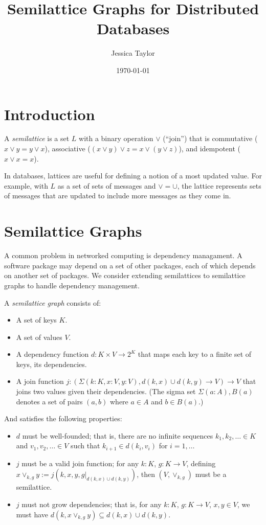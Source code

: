 \documentclass{article}
\title{Semilattice Graphs for Distributed Databases}
\author{Jessica Taylor}
\date{\today}
\begin{document}
    \maketitle
    
    \section{Introduction}
        A \emph{semilattice} is a set $L$ with a binary operation $\vee$ (``join'') that is commutative ($x \vee y = y \vee x$), associative ($(x \vee y) \vee z = x \vee (y \vee z)$), and idempotent ($x \vee x = x$).

        In databases, lattices are useful for defining a notion of a most updated value. For example, with $L$ as a set of sets of messages and $\vee = \cup$, the lattice represents sets of messages that are updated to include more messages as they come in.


    \section{Semilattice Graphs}

        A common problem in networked computing is dependency managament. A software package may depend on a set of other packages, each of which depends on another set of packages. We consider extending semilattices to semilattice graphs to handle dependency management.
        
        A \emph{semilattice graph} consists of:

        \begin{itemize}
            \item A set of keys $K$.
            \item A set of values $V$.
            \item A dependency function $d : K \times V \rightarrow 2^K$ that maps each key to a finite set of keys, its dependencies.
            \item A join function $j : (\Sigma (k: K, x : V, y : V), d(k, x) \cup d(k, y) \rightarrow V) \rightarrow V$ that joins two values given their dependencies. (The sigma set $\Sigma (a: A), B(a)$ denotes a set of pairs $(a, b)$ where $a \in A$ and $b \in B(a)$.)
        \end{itemize}

        And satisfies the following properties:

        \begin{itemize}
            \item $d$ must be well-founded; that is, there are no infinite sequences $k_1, k_2, \ldots \in K$ and $v_1, v_2, \ldots \in V$ such that $k_{i+1} \in d(k_i, v_i)$ for $i = 1, \ldots$
            \item $j$ must be a valid join function; for any $k : K$, $g: K \rightarrow V$, defining $x \vee_{k,g} y := j(k, x, y, g|_{d(k, x) \cup d(k, y)})$, then $(V, \vee_{k,g})$ must be a semilattice.
            \item $j$ must not grow dependencies; that is, for any $k : K$, $g: K \rightarrow V$, $x, y \in V$, we must have $d(k, x \vee_{k, g} y) \subseteq d(k, x) \cup d(k, y)$.
        \end{itemize}
\end{document}

